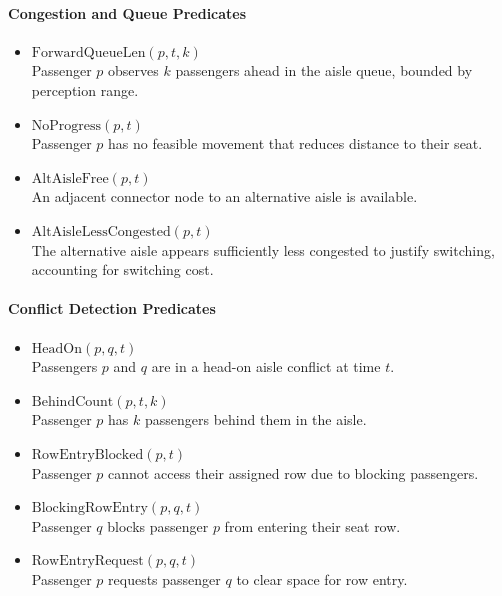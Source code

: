 \documentclass[11pt,a4paper]{article}
\begin{document}
\paragraph{Congestion and Queue Predicates}

\begin{itemize}

\item $\text{ForwardQueueLen}(p,t,k)$\\
Passenger $p$ observes $k$ passengers ahead in the aisle queue, bounded by perception range.

\item $\text{NoProgress}(p,t)$\\
Passenger $p$ has no feasible movement that reduces distance to their seat.

\item $\text{AltAisleFree}(p,t)$\\
An adjacent connector node to an alternative aisle is available.

\item $\text{AltAisleLessCongested}(p,t)$\\
The alternative aisle appears sufficiently less congested to justify switching, accounting for switching cost.

\end{itemize}

\paragraph{Conflict Detection Predicates}

\begin{itemize}

\item $\text{HeadOn}(p,q,t)$\\
Passengers $p$ and $q$ are in a head-on aisle conflict at time $t$.

\item $\text{BehindCount}(p,t,k)$\\
Passenger $p$ has $k$ passengers behind them in the aisle.

\item $\text{RowEntryBlocked}(p,t)$\\
Passenger $p$ cannot access their assigned row due to blocking passengers.

\item $\text{BlockingRowEntry}(p,q,t)$\\
Passenger $q$ blocks passenger $p$ from entering their seat row.

\item $\text{RowEntryRequest}(p,q,t)$\\
Passenger $p$ requests passenger $q$ to clear space for row entry.

\end{itemize}
\end{document}
